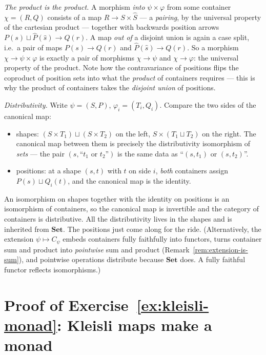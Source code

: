 \documentclass[11pt, a4paper]{article}
\theoremstyle{definition}
\theoremstyle{plain}
\begin{document}
\emph{The product is the product.}  A morphism \emph{into}
$\psi \times \varphi$ from some container $\chi = (R, Q)$
consists of a map $R \to S \times \hat{S}$ --- a \emph{pairing},
by the universal property of the cartesian product --- together
with backwards position arrows
$P(s) \sqcup \hat{P}(\hat{s}) \to Q(r)$.  A map \emph{out of} a
disjoint union is again a case split, i.e.\ a pair of maps
$P(s) \to Q(r)$ and $\hat{P}(\hat{s}) \to Q(r)$.  So a morphism
$\chi \to \psi \times \varphi$ is exactly a pair of morphisms
$\chi \to \psi$ and $\chi \to \varphi$: the universal property
of the product.  Note how the contravariance of positions flips
the coproduct of position sets into what the \emph{product} of
containers requires --- this is why the product of containers
takes the \emph{disjoint union} of positions.

\emph{Distributivity.}  Write $\psi = (S, P)$,
$\varphi_i = (T_i, Q_i)$.  Compare the two sides of the canonical
map:
\begin{itemize}
  \item shapes: $(S \times T_1) \sqcup (S \times T_2)$ on the left,
    $S \times (T_1 \sqcup T_2)$ on the right.  The canonical map
    between them is precisely the distributivity isomorphism of
    \emph{sets} --- the pair $(s, \text{``$t_1$ or $t_2$''})$ is
    the same data as ``$(s, t_1)$ or $(s, t_2)$''.
  \item positions: at a shape $(s, t)$ with $t$ on side $i$,
    \emph{both} containers assign $P(s) \sqcup Q_i(t)$, and the
    canonical map is the identity.
\end{itemize}
An isomorphism on shapes together with the identity on positions is
an isomorphism of containers, so the canonical map is invertible
and the category of containers is distributive.  All the
distributivity lives in the shapes and is inherited from
$\mathbf{Set}$.  The positions just come along for the ride.
(Alternatively, the extension $\psi \mapsto C_\psi$ embeds
containers fully faithfully into functors, turns container sum and
product into \emph{pointwise} sum and product
(Remark~\ref{rem:extension-is-sum}), and pointwise operations
distribute because $\mathbf{Set}$ does.  A fully faithful functor
reflects isomorphisms.)

\section{Proof of Exercise~\ref{ex:kleisli-monad}: Kleisli maps make
a monad}\label{app:kleisli}
\end{document}
